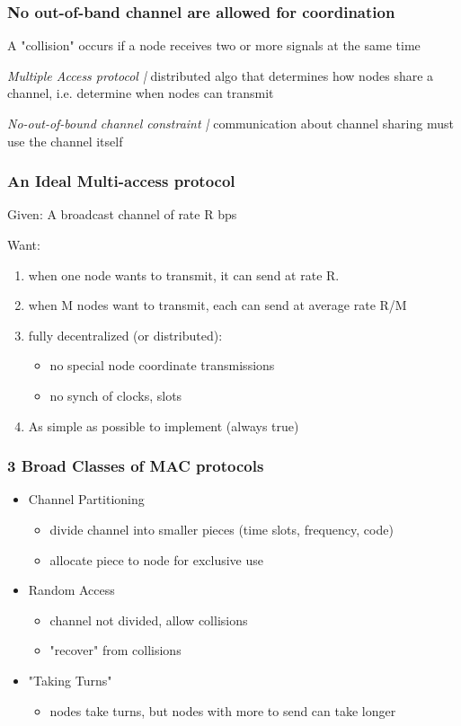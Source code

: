 \documentclass{article}
\newcommand{\define}[1]{\noindent\textit{#1 |}}
\begin{document}
\subsubsection*{No out-of-band channel are allowed for coordination}

A "collision" occurs if a node receives two or more signals at the same time

\define{Multiple Access protocol} distributed algo that determines how nodes share a channel, i.e. determine when nodes can transmit

\define{No-out-of-bound channel constraint} communication about channel sharing must use the channel itself

\subsubsection*{An Ideal Multi-access protocol}

Given: A broadcast channel of rate R bps

\noindent Want:
\begin{enumerate}
	\item when one node wants to transmit, it can send at rate R.
	\item when M nodes want to transmit, each can send at average rate R/M
	\item fully decentralized (or distributed):
		\begin{itemize}
			\item no special node coordinate transmissions
			\item no synch of clocks, slots
		\end{itemize}
	\item As simple as possible to implement (always true)
\end{enumerate}

\subsubsection*{3 Broad Classes of MAC protocols}

\begin{itemize}
	\item Channel Partitioning
	\begin{itemize}
		\item divide channel into smaller pieces (time slots, frequency, code)
		\item allocate piece to node for exclusive use
	\end{itemize}
	\item Random Access
	\begin{itemize}
		\item channel not divided, allow collisions
		\item "recover" from collisions 
	\end{itemize}		
	\item "Taking Turns"
	\begin{itemize}
		\item nodes take turns, but nodes with more to send can take longer
	\end{itemize}
\end{itemize}
\end{document}
